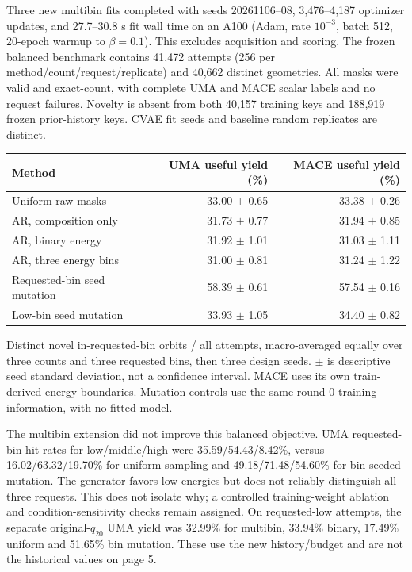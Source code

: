 Three new multibin fits completed with seeds 20261106--08, 3,476--4,187 optimizer
updates, and 27.7--30.8 s fit wall time on an A100 (Adam, rate $10^{-3}$,
batch 512, 20-epoch warmup to $\beta=0.1$). This excludes acquisition
and scoring. The frozen balanced benchmark contains 41,472 attempts (256 per
method/count/request/replicate) and 40,662 distinct geometries. All masks were
valid and exact-count, with complete UMA and MACE scalar labels and no request
failures. Novelty is absent from both 40,157 training keys and 188,919 frozen
prior-history keys. CVAE fit seeds and baseline random replicates are distinct.

\begin{center}\small
\begin{tabular}{lrr}
\toprule
Method & UMA useful yield (\%) & MACE useful yield (\%)\\
\midrule
Uniform raw masks & 33.00 $\pm$ 0.65 & 33.38 $\pm$ 0.26\\
AR, composition only & 31.73 $\pm$ 0.77 & 31.94 $\pm$ 0.85\\
AR, binary energy & 31.92 $\pm$ 1.01 & 31.03 $\pm$ 1.11\\
AR, three energy bins & 31.00 $\pm$ 0.81 & 31.24 $\pm$ 1.22\\
Requested-bin seed mutation & 58.39 $\pm$ 0.61 & 57.54 $\pm$ 0.16\\
Low-bin seed mutation & 33.93 $\pm$ 1.05 & 34.40 $\pm$ 0.82\\
\bottomrule
\end{tabular}
\end{center}
{\footnotesize Distinct novel in-requested-bin orbits / all attempts, macro-averaged
equally over three counts and three requested bins, then three design seeds.
$\pm$ is descriptive seed standard deviation, not a confidence interval.
MACE uses its own train-derived energy boundaries. Mutation controls use the same round-0 training information, with no fitted model.}

The multibin extension did not improve this balanced objective. UMA requested-bin
hit rates for low/middle/high were 35.59/54.43/8.42\%, versus
16.02/63.32/19.70\% for uniform sampling and 49.18/71.48/54.60\% for
bin-seeded mutation. The generator favors low energies but does not reliably
distinguish all three requests. This does not isolate why; a controlled
training-weight ablation and condition-sensitivity checks remain assigned.
On requested-low attempts, the separate original-$q_{20}$ UMA yield was
32.99\% for multibin, 33.94\% binary, 17.49\% uniform and 51.65\% bin mutation.
These use the new history/budget and are not the historical values on page 5.

